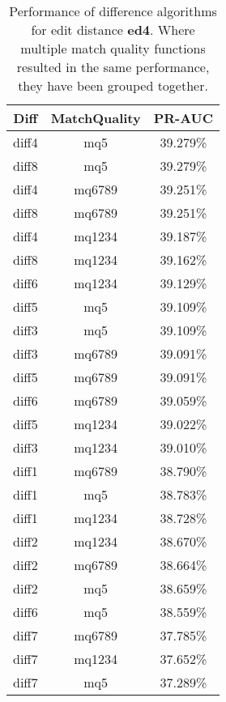 \begin{table}[tbph]
\begin{center}
\begin{tabular}{|c|c||c|}
\hline
Diff & MatchQuality & PR-AUC  \\
\hline
\hline
diff4 & mq5 & 39.279\% \\
diff8 & mq5 & 39.279\% \\
diff4 & mq6789 & 39.251\% \\
diff8 & mq6789 & 39.251\% \\
diff4 & mq1234 & 39.187\% \\
diff8 & mq1234 & 39.162\% \\
diff6 & mq1234 & 39.129\% \\
diff5 & mq5 & 39.109\% \\
diff3 & mq5 & 39.109\% \\
diff3 & mq6789 & 39.091\% \\
diff5 & mq6789 & 39.091\% \\
diff6 & mq6789 & 39.059\% \\
diff5 & mq1234 & 39.022\% \\
diff3 & mq1234 & 39.010\% \\
diff1 & mq6789 & 38.790\% \\
diff1 & mq5 & 38.783\% \\
diff1 & mq1234 & 38.728\% \\
diff2 & mq1234 & 38.670\% \\
diff2 & mq6789 & 38.664\% \\
diff2 & mq5 & 38.659\% \\
diff6 & mq5 & 38.559\% \\
diff7 & mq6789 & 37.785\% \\
diff7 & mq1234 & 37.652\% \\
diff7 & mq5 & 37.289\% \\
\hline
\end{tabular}
\end{center}
\caption[Comparison of diff algorithms using edit distance \textbf{ed4}]{
  Performance of difference algorithms for
  edit distance \textbf{ed4}.  Where multiple match
  quality functions resulted in the same performance, they
  have been grouped together.}
\label{tab:editlongbyed4}
\end{table}
